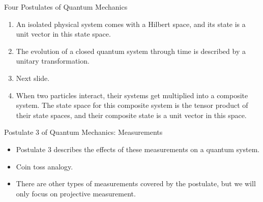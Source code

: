 \documentclass[handout, 10 pt]{beamer}
\begin{document}
\begin{frame}{Four Postulates of Quantum Mechanics}

    \begin{enumerate}
        \item An isolated physical system comes with a Hilbert space, and its state is a unit vector in this state space. 
        \pause
        \item The evolution of a closed quantum system through time is described by a unitary transformation.
        \pause
        \item Next slide.
        \pause
        \item When two particles interact, their systems get multiplied into a composite system.  The state space for this composite system is the tensor product of their state spaces, and their composite state is a unit vector in this space. 
 
    \end{enumerate}
\end{frame}

\begin{comment}
Recall Schrodinger's cat.
\end{comment}
\begin{frame}{Postulate 3 of Quantum Mechanics: Measurements}
\begin{itemize}
    \item Postulate 3 describes the effects of these measurements on a quantum system.
    \pause
    \item Coin toss analogy.
    \item There are other types of measurements covered by the postulate, but we will only focus on projective measurement.
\end{itemize}

\end{frame}
\end{document}
